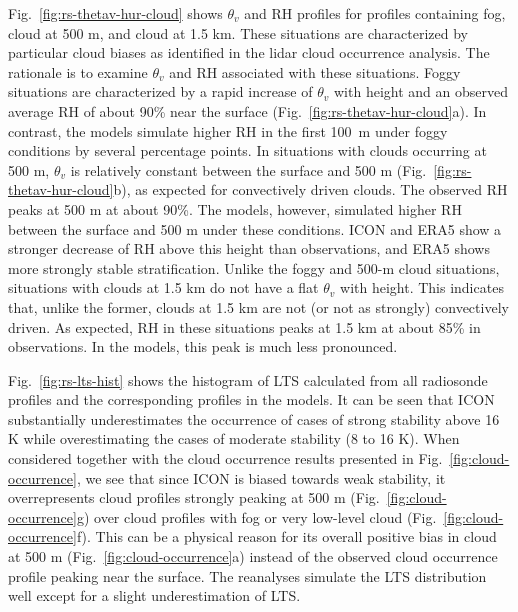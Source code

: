 \documentclass[draft]{agujournal2019}
\begin{document}
Fig.~\ref{fig:rs-thetav-hur-cloud} shows $\theta_v$ and RH profiles for profiles containing fog, cloud at 500 m, and cloud at 1.5 km. These situations are characterized by particular cloud biases as identified in the lidar cloud occurrence analysis. The rationale is to examine $\theta_v$ and RH associated with these situations. Foggy situations are characterized by a rapid increase of $\theta_v$ with height and an observed average RH of about 90\% near the surface (Fig.~\ref{fig:rs-thetav-hur-cloud}a). In contrast, the models simulate higher RH in the first 100~m under foggy conditions by several percentage points. In situations with clouds occurring at 500 m, $\theta_v$ is relatively constant between the surface and 500 m (Fig.~\ref{fig:rs-thetav-hur-cloud}b), as expected for convectively driven clouds. The observed RH peaks at 500 m at about 90\%. The models, however, simulated higher RH between the surface and 500 m under these conditions. ICON and ERA5 show a stronger decrease of RH above this height than observations, and ERA5 shows more strongly stable stratification. Unlike the foggy and 500-m cloud situations, situations with clouds at 1.5 km do not have a flat $\theta_v$ with height. This indicates that, unlike the former, clouds at 1.5 km are not (or not as strongly) convectively driven. As expected, RH in these situations peaks at 1.5 km at about 85\% in observations. In the models, this peak is much less pronounced.

Fig.~\ref{fig:rs-lts-hist} shows the histogram of LTS calculated from all radiosonde profiles and the corresponding profiles in the models. It can be seen that ICON substantially underestimates the occurrence of cases of strong stability above 16 K while overestimating the cases of moderate stability (8 to 16 K). When considered together with the cloud occurrence results presented in Fig.~\ref{fig:cloud-occurrence}, we see that since ICON is biased towards weak stability, it overrepresents cloud profiles strongly peaking at 500 m (Fig.~\ref{fig:cloud-occurrence}g) over cloud profiles with fog or very low-level cloud (Fig.~\ref{fig:cloud-occurrence}f). This can be a physical reason for its overall positive bias in cloud at 500 m (Fig.~\ref{fig:cloud-occurrence}a) instead of the observed cloud occurrence profile peaking near the surface. The reanalyses simulate the LTS distribution well except for a slight underestimation of LTS.
\end{document}
